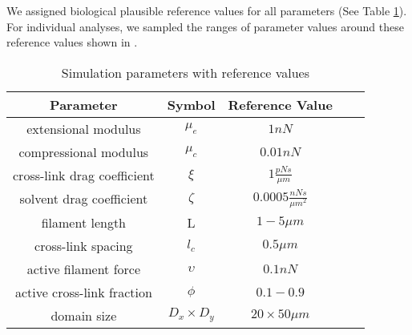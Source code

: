 \documentclass[10pt,letterpaper]{article}
\begin{document}
We assigned biological plausible reference values for all parameters (See Table \ref{table:para}).  For individual analyses, we sampled the ranges of parameter values around these reference values shown in .

\begin{table}[h]
\centering
\caption{Simulation parameters with reference values}
\label{table:para}
\begin{tabular}{|c|c|c|c|c|}
\hline
{\bf Parameter}             & {\bf Symbol} & {\bf Reference Value}          \\ \hline
extensional modulus         & $\mu_e$        & $1 nN $                                               \\
compressional modulus             & $\mu_c$     & $ 0.01 nN $                           \\
cross-link drag coefficient & $\xi$      & $ 1 \frac{pN s}{\mu m} $              \\
solvent drag coefficient     & $\zeta$        & $0.0005 \frac{nN s}{\mu m^2} $      \\
filament length             & L            & $1-5 \mu m$                                          \\
cross-link spacing          & $l_c$        & $0.5 \mu m$                                         \\
active filament force          & $\upsilon$        & $0.1 nN$                                         \\
active cross-link fraction          & $\phi$        & $0.1-0.9$                                         \\
domain size                 & $D_x\times D_y$            & $20\times 50 \mu m$                                 \\ \hline
\end{tabular}
\end{table}



\end{document}
